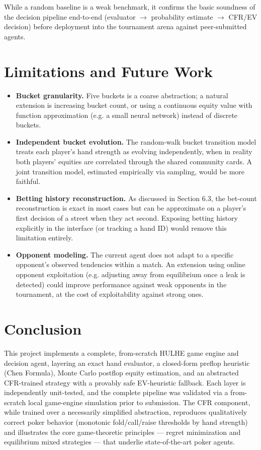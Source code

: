 \documentclass[11pt]{article}
\begin{document}
While a random baseline is a weak benchmark, it confirms the basic
soundness of the decision pipeline end-to-end (evaluator $\to$ probability
estimate $\to$ CFR/EV decision) before deployment into the tournament arena
against peer-submitted agents.

\section{Limitations and Future Work}

\begin{itemize}
    \item \textbf{Bucket granularity.} Five buckets is a coarse abstraction;
    a natural extension is increasing bucket count, or using a continuous
    equity value with function approximation (e.g. a small neural network)
    instead of discrete buckets.
    \item \textbf{Independent bucket evolution.} The random-walk bucket
    transition model treats each player's hand strength as evolving
    independently, when in reality both players' equities are correlated
    through the shared community cards. A joint transition model, estimated
    empirically via sampling, would be more faithful.
    \item \textbf{Betting history reconstruction.} As discussed in Section
    6.3, the bet-count reconstruction is exact in most cases but can be
    approximate on a player's first decision of a street when they act
    second. Exposing betting history explicitly in the interface (or
    tracking a hand ID) would remove this limitation entirely.
    \item \textbf{Opponent modeling.} The current agent does not adapt to a
    specific opponent's observed tendencies within a match. An extension
    using online opponent exploitation (e.g. adjusting away from equilibrium
    once a leak is detected) could improve performance against weak
    opponents in the tournament, at the cost of exploitability against
    strong ones.
\end{itemize}

\section{Conclusion}

This project implements a complete, from-scratch HULHE game engine and
decision agent, layering an exact hand evaluator, a closed-form preflop
heuristic (Chen Formula), Monte Carlo postflop equity estimation, and an
abstracted CFR-trained strategy with a provably safe EV-heuristic fallback.
Each layer is independently unit-tested, and the complete pipeline was
validated via a from-scratch local game-engine simulation prior to
submission. The CFR component, while trained over a necessarily simplified
abstraction, reproduces qualitatively correct poker behavior (monotonic
fold/call/raise thresholds by hand strength) and illustrates the core
game-theoretic principles --- regret minimization and equilibrium mixed
strategies --- that underlie state-of-the-art poker agents.
\end{document}
